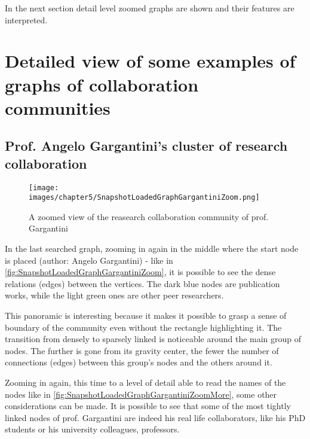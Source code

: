 In the next section detail level zoomed graphs are shown and their features are interpreted.

\section{Detailed view of some examples of graphs of collaboration communities} \label{section:Displayoftheresults/Detailedviewofsomeexamplesofgraphsofcollaborationcommunities}

\subsection{Prof. Angelo Gargantini's cluster of research collaboration} \label{subsection:Displayoftheresults/Indetailviewofthecollaborationgraph/ProfAngeloGargantinisclusterofresearchcollaboration}
\begin{figure}[H]%
	\centering%
	\texttt{[image: images/chapter5/SnapshotLoadedGraphGargantiniZoom.png]}%
	\caption[A zoomed view of the research collaboration community of prof. Gargantini]{A zoomed view of the reasearch collaboration community of prof. Gargantini}%
	\label{fig:SnapshotLoadedGraphGargantiniZoom}%
\end{figure}%

In the last searched graph, zooming in again in the middle where the start node is placed (author: Angelo Gargantini) - like in \hyperref[fig:SnapshotLoadedGraphGargantiniZoom]{\autoref{fig:SnapshotLoadedGraphGargantiniZoom}}, it is possible to see the dense relations (edges) between the vertices.
The dark blue nodes are publication works, while the light green ones are other peer researchers.

This panoramic is interesting because it makes it possible to grasp a sense of boundary of the community even without the rectangle highlighting it.
The transition from densely to sparsely linked is noticeable around the main group of nodes. The further is gone from its gravity center, the fewer the number of connections (edges) between this group's nodes and the others around it.

Zooming in again, this time to a level of detail able to read the names of the nodes like in \hyperref[fig:SnapshotLoadedGraphGargantiniZoomMore]{\autoref{fig:SnapshotLoadedGraphGargantiniZoomMore}}, some other considerations can be made. It is possible to see that some of the most tightly linked nodes of prof. Gargantini are indeed his real life collaborators, like his PhD students or his university colleagues, professors.

